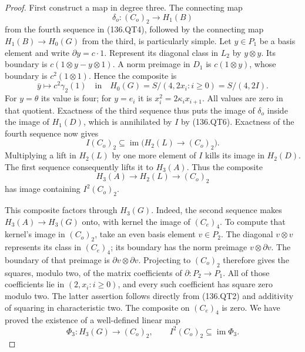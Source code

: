\begin{proof}
First construct a map in degree three.  The connecting map
\[
                    \delta_o:(C_o)_2\longrightarrow H_1(B)
\]
from the fourth sequence in (136.QT4), followed by the connecting
map \(H_1(B)\to H_0(G)\) from the third, is particularly simple.
Let \(y\in P_1\) be a basis element and write
\(\partial y=c\cdot1\).  Represent its diagonal class in
\(L_2\) by \(y\otimes y\).  Its boundary is
\(c(1\otimes y-y\otimes1)\).  A norm preimage in \(D_1\)
is \(c(1\otimes y)\), whose boundary is
\(c^2(1\otimes1)\).  Hence the composite is
\[
       \bar y\longmapsto c^2\gamma_2(1)
                   \quad\text{in}\quad
       H_0(G)=S/(4,2x_i:i\geq0)=S/(4,2I).
                                                               \tag{136.QT9}
\]
For \(y=\theta\) its value is four; for \(y=e_i\) it is
\(x_i^2=2\kappa_i x_{i+1}\).  All values are zero in that
quotient.  Exactness of the third sequence thus puts the image
of \(\delta_o\) inside the image of \(H_1(D)\), which is
annihilated by \(I\) by (136.QT6).  Exactness of the fourth
sequence now gives
\[
 I(C_o)_2\subseteq
     \operatorname{im}\bigl(H_2(L)\longrightarrow(C_o)_2\bigr).
                                                               \tag{136.QT10}
\]
Multiplying a lift in \(H_2(L)\) by one more element of \(I\)
kills its image in \(H_2(D)\).  The first sequence consequently
lifts it to \(H_3(A)\).  Thus the composite
\[
           H_3(A)\longrightarrow H_2(L)\longrightarrow(C_o)_2
\]
has image containing \(I^2(C_o)_2\).

This composite factors through \(H_3(G)\).  Indeed, the second
sequence makes \(H_3(A)\to H_3(G)\) onto, with kernel the
image of \((C_e)_4\).  To compute that kernel's image in
\((C_o)_2\), take an even basis element \(v\in P_2\).
The diagonal \(v\otimes v\) represents its class in
\((C_e)_4\); its boundary has the norm preimage
\(v\otimes\partial v\).  The boundary of that preimage is
\(\partial v\otimes\partial v\).  Projecting to \((C_o)_2\)
therefore gives the squares, modulo two, of the matrix
coefficients of \(\partial:P_2\to P_1\).  All of those
coefficients lie in \((2,x_i:i\geq0)\), and every such
coefficient has square zero modulo two.  The latter assertion
follows directly from (136.QT2) and additivity of squaring in
characteristic two.  The composite on \((C_e)_4\) is zero.
We have proved the existence of a well-defined linear map
\[
        \Phi_3:H_3(G)\longrightarrow(C_o)_2,
          \qquad I^2(C_o)_2\subseteq\operatorname{im}\Phi_3.
                                                               \tag{136.QT11}
\]


\end{proof}
